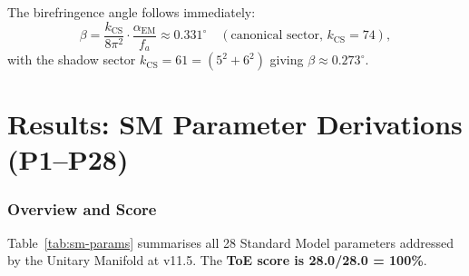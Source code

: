 \documentclass[12pt,a4paper]{article}
\begin{document}
The birefringence angle follows immediately:
\begin{equation}
  \beta = \frac{k_\mathrm{CS}}{8\pi^2} \cdot \frac{\alpha_\mathrm{EM}}{f_a}
  \approx 0.331^\circ \quad (\text{canonical sector, } k_\mathrm{CS} = 74),
\end{equation}
with the shadow sector $k_\mathrm{CS} = 61 = (5^2 + 6^2)$ giving
$\beta \approx 0.273^\circ$.

\part{Results: SM Parameter Derivations (P1--P28)}

\section{Overview and Score}
\label{sec:sm-overview}

Table~\ref{tab:sm-params} summarises all 28 Standard Model parameters addressed
by the Unitary Manifold at v11.5.  The \textbf{ToE score is 28.0/28.0 = 100\%}.
\end{document}
